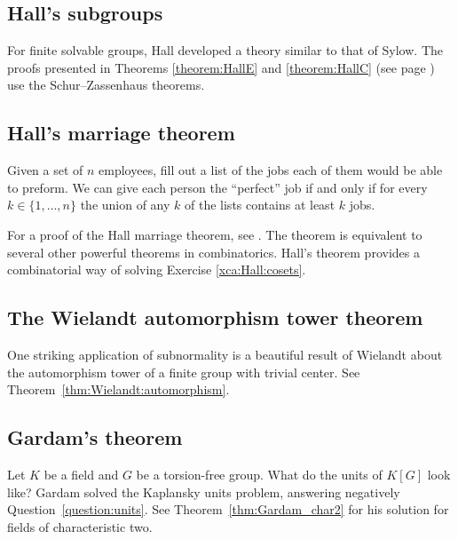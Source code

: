 \subsection*{Hall's subgroups}

For finite solvable groups, Hall developed a theory similar to that of Sylow. The proofs
presented in Theorems \ref{theorem:HallE} and \ref{theorem:HallC} (see page \pageref{theorem:HallC}) use
the Schur--Zassenhaus theorems. 


\subsection*{Hall's marriage theorem}

Given a set of $n$ employees, fill out a list of the jobs each of them
would be able to preform. We can give each person the ``perfect'' job
if and only if for every $k\in\{1,\dots,n\}$ 
the union of any $k$ of the lists contains at least $k$ jobs. 

For a proof of the Hall marriage theorem, see \cite{MR33330}. 
The theorem is equivalent to several other
powerful theorems in combinatorics. Hall's theorem 
provides a combinatorial way of solving 
Exercise \ref{xca:Hall:cosets}. 


\subsection*{The Wielandt automorphism tower theorem}

One striking application of subnormality is a beautiful result 
of Wielandt about the automorphism tower of a finite group 
with trivial center. See 
Theorem~\ref{thm:Wielandt:automorphism}.

\subsection*{Gardam's theorem}

Let $K$ be a field and $G$ be a torsion-free group.
What do the units of $K[G]$ look like? 
Gardam solved the Kaplansky units problem, answering 
negatively Question~\ref{question:units}. 
See Theorem~\ref{thm:Gardam_char2} for his solution
for fields of characteristic two.  


